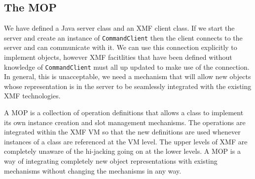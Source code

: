 \documentclass{article}
\begin{document}
\subsection{The MOP}

We have defined a Java server class and an XMF client class. If we start the server
and create an instance of {\tt CommandClient} then the client connects to the server
and can communicate with it. We can use this connection explicitly to implement 
objects, however XMF facitlities that have been defined without knowledge of 
{\tt CommandClient} must all up updated to make use of the connection. In general,
this is unacceptable, we need a mechanism that will allow new objects whose representation
is in the server to be seamlessly integrated with the existing XMF technologies.

A MOP is a collection of operation definitions that allows a class to implement 
its own instance creation and slot management mechanisms. The operations are integrated
within the XMF VM so that the new definitions are used whenever instances of
a class are referenced at the VM level. The upper levels of XMF are completely
unaware of the hi-jacking going on at the lower levels. A MOP is a way of integrating
completely new object representations with existing mechanisms without changing the
mechanisms in any way.
\end{document}
